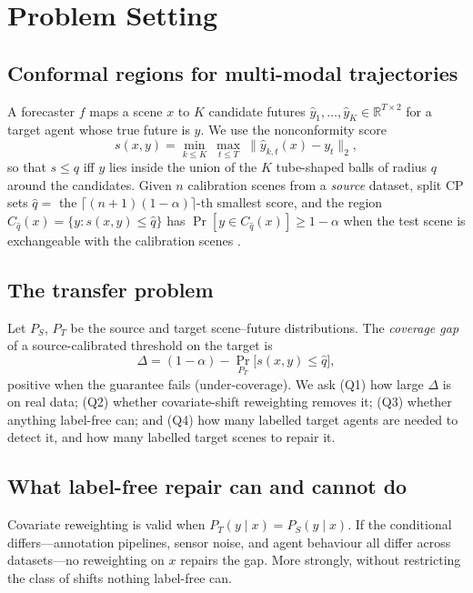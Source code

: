 \section{Problem Setting}\label{sec:problem}
\subsection{Conformal regions for multi-modal trajectories}
A forecaster $f$ maps a scene $x$ to $K$ candidate futures $\hat y_1,\dots,\hat y_K\in\mathbb{R}^{T\times 2}$ for a target
agent whose true future is $y$. We use the nonconformity score
\begin{equation}
s(x,y)=\min_{k\le K}\ \max_{t\le T}\ \|\hat y_{k,t}(x)-y_t\|_2 ,
\end{equation}
so that $s\le q$ iff $y$ lies inside the union of the $K$ tube-shaped balls of radius $q$ around the candidates. Given $n$
calibration scenes from a \emph{source} dataset, split CP sets $\hat q=$ the $\lceil (n+1)(1-\alpha)\rceil$-th smallest score,
and the region $C_{\hat q}(x)=\{y:s(x,y)\le\hat q\}$ has $\Pr[y\in C_{\hat q}(x)]\ge 1-\alpha$ when the test scene is
exchangeable with the calibration scenes \cite{vovk2005algorithmic,angelopoulos2023gentle}.

\subsection{The transfer problem}
Let $P_S$, $P_T$ be the source and target scene--future distributions. The \emph{coverage gap} of a source-calibrated
threshold on the target is
\begin{equation}
\Delta=(1-\alpha)-\Pr_{P_T}\!\big[s(x,y)\le \hat q\big],
\end{equation}
positive when the guarantee fails (under-coverage). We ask (Q1) how large $\Delta$ is on real data; (Q2) whether
covariate-shift reweighting \cite{tibshirani2019covariate} removes it; (Q3) whether anything label-free can; and (Q4) how
many labelled target agents are needed to detect it, and how many labelled target scenes to repair it.

\subsection{What label-free repair can and cannot do}
Covariate reweighting is valid when $P_T(y\mid x)=P_S(y\mid x)$. If the conditional differs---annotation pipelines, sensor
noise, and agent behaviour all differ across datasets---no reweighting on $x$ repairs the gap. More strongly, without
restricting the class of shifts nothing label-free can.

